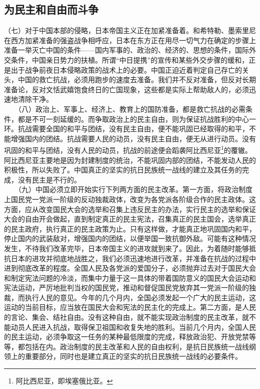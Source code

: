 \documentclass[cn,11pt,chinese]{elegantbook}
\def\myformat#1{\hfil\hfil #1}
\begin{document}
\subsection*{\myformat{为民主和自由而斗争 }}
（七）对于中国本部的侵略，日本帝国主义正在加紧准备着。和希特勒、墨索里尼在西方加紧准备的强盗战争相呼应，日本在东方正在用尽一切气力在确定的步骤上准备一举灭亡中国的条件——国内军事的、政治的、经济的、思想的条件，国际外交条件，中国亲日势力的扶植。所谓“中日提携”的宣传和某些外交步骤的缓和，正是出于战争前夜日本侵略政策的战术上的必要。中国正迫近着判定自己存亡的关头，中国的救亡抗战，必须用跑步的速度去准备。我们并不反对准备，但反对长期准备论，反对文恬武嬉饱食终日的亡国现象，这些都是实际上帮助敌人的，必须迅速地清除干净。\\
　　（八）政治上、军事上、经济上、教育上的国防准备，都是救亡抗战的必需条件，都是不可一刻延缓的。而争取政治上的民主自由，则为保证抗战胜利的中心一环。抗战需要全国的和平与团结，没有民主自由，便不能巩固已经取得的和平，不能增强国内的团结。抗战需要人民的动员，没有民主自由，便无从进行动员。没有巩固的和平与团结，没有人民的动员，抗战的前途便会蹈袭阿比西尼亚\footnote[17]{ 阿比西尼亚，即埃塞俄比亚。}的覆辙。阿比西尼亚主要地是因为封建制度的统治，不能巩固内部的团结，不能发动人民的积极性，所以失败了。中国真正的坚实的抗日民族统一战线的建立及其任务的完成，没有民主是不行的。\\
　　（九）中国必须立即开始实行下列两方面的民主改革。第一方面，将政治制度上国民党一党派一阶级的反动独裁政体，改变为各党派各阶级合作的民主政体。这方面，应从改变国民大会的选举和召集上违反民主的办法，实行民主的选举和保证大会的自由开会做起，直到制定真正的民主宪法，召集真正的民主国会，选举真正的民主政府，执行真正的民主政策为止。只有这样做，才能真正地巩固国内和平，停止国内的武装敌对，增强国内的团结，以便举国一致抗御外敌。可能有这种情况发生，不待我们改革完毕，日本帝国主义的进攻就到来了。因此，为着随时能够抵抗日本的进攻并彻底地战胜之，我们必须迅速地进行改革，并准备在抗战的过程中进到彻底改革的程度。全国人民及各党派的爱国分子，必须抛弃过去对于国民大会和制定宪法问题的冷淡，而集中力量于这一具体的带着国防意义的国民大会运动和宪法运动，严厉地批判当权的国民党，推动和督促国民党放弃其一党派一阶级的独裁，而执行人民的意见。今年的几个月内，全国必须发起一个广大的民主运动，这运动的当前目标，应当放在国民大会和宪法的民主化的完成上。第二方面，是人民的言论、集会、结社自由。没有这种自由，就不能实现政治制度的民主改革，就不能动员人民进入抗战，取得保卫祖国和收复失地的胜利。当前几个月内，全国人民的民主运动，必须争取这一任务的某种最低限度的完成，释放政治犯、开放党禁等等，都包括在内。政治制度的民主改革和人民的自由权利，是抗日民族统一战线纲领上的重要部分，同时也是建立真正的坚实的抗日民族统一战线的必要条件。\\
\end{document}
